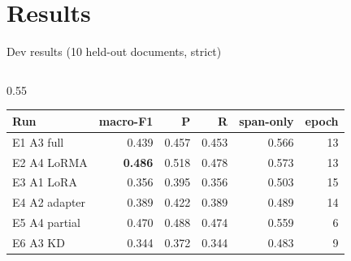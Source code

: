 \documentclass[aspectratio=169,11pt]{beamer}
\begin{document}
\section{Results}

\begin{frame}{Dev results (10 held-out documents, strict)}
  \begin{columns}[T]
    \begin{column}{0.55\textwidth}
      \scriptsize
      \begin{tabular}{@{}lrrrrr@{}}
        \toprule
        Run & macro-F1 & P & R & span-only & epoch \\
        \midrule
        E1 A3 full & 0.439 & 0.457 & 0.453 & 0.566 & 13 \\
        E2 A4 LoRMA & \textbf{0.486} & 0.518 & 0.478 & 0.573 & 13 \\
        E3 A1 LoRA & 0.356 & 0.395 & 0.356 & 0.503 & 15 \\
        E4 A2 adapter & 0.389 & 0.422 & 0.389 & 0.489 & 14 \\
        E5 A4 partial & 0.470 & 0.488 & 0.474 & 0.559 & 6 \\
        E6 A3 KD & 0.344 & 0.372 & 0.344 & 0.483 & 9 \\
        \bottomrule
      \end{tabular}
      \vspace{2mm}


\end{column}
\end{columns}
\end{frame}
\end{document}
